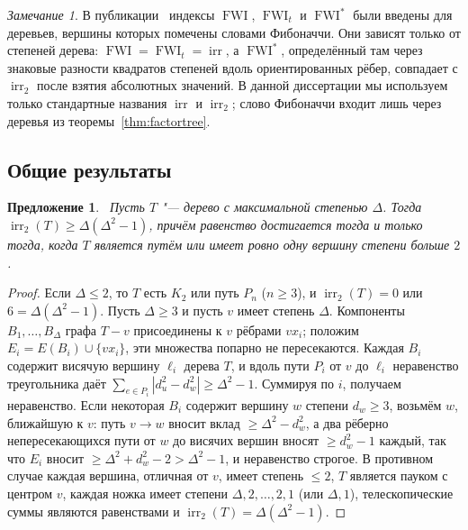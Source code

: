\documentclass[a4paper,14pt]{extreport}
\theoremstyle{plain}
\newtheorem{proposition}[theorem]{Предложение}
\theoremstyle{definition}
\theoremstyle{remark}
\newtheorem{remark}{Замечание}
\begin{document}
\begin{remark}
	В публикации~\cite{HamoudAbdullahCheb} индексы $\operatorname{FWI}$, $\operatorname{FWI}_t$ и $\operatorname{FWI}^*$ были введены для деревьев, вершины которых помечены словами Фибоначчи.
	Они зависят только от степеней дерева: $\operatorname{FWI}=\operatorname{FWI}_t=\operatorname{irr}$, а $\operatorname{FWI}^*$, определённый там через знаковые разности квадратов степеней вдоль ориентированных рёбер, совпадает с $\operatorname{irr}_2$ после взятия абсолютных значений.
	В данной диссертации мы используем только стандартные названия $\operatorname{irr}$ и $\operatorname{irr}_2$; слово Фибоначчи входит лишь через деревья из теоремы~\ref{thm:factortree}.
\end{remark}
\subsection{Общие результаты}

\begin{proposition}~\label{pron1}
	Пусть $T$ "--- дерево с максимальной степенью $\Delta$. Тогда $\operatorname{irr}_2(T)\ge\Delta(\Delta^2-1)$, причём равенство достигается тогда и только тогда, когда $T$ является путём или имеет ровно одну вершину степени больше $2$.
\end{proposition}

\begin{proof}
	Если $\Delta\le2$, то $T$ есть $K_2$ или путь $P_n$ ($n\ge3$), и $\operatorname{irr}_2(T)=0$ или $6=\Delta(\Delta^2-1)$. Пусть $\Delta\ge3$ и пусть $v$ имеет степень $\Delta$.
	Компоненты $B_1,\dots,B_\Delta$ графа $T-v$ присоединены к $v$ рёбрами $vx_i$; положим $E_i=E(B_i)\cup\{vx_i\}$, эти множества попарно не пересекаются.
	Каждая $B_i$ содержит висячую вершину $\ell_i$ дерева $T$, и вдоль пути $P_i$ от $v$ до $\ell_i$ неравенство треугольника даёт
	$\sum_{e\in P_i}|d_u^2-d_w^2|\ge\Delta^2-1$. Суммируя по $i$, получаем неравенство.
	Если некоторая $B_i$ содержит вершину $w$ степени $d_w\ge3$, возьмём $w$, ближайшую к $v$: путь $v\to w$ вносит вклад $\ge\Delta^2-d_w^2$, а два рёберно непересекающихся пути от $w$ до висячих вершин вносят $\ge d_w^2-1$ каждый,
	так что $E_i$ вносит $\ge\Delta^2+d_w^2-2>\Delta^2-1$, и неравенство строгое. В противном случае каждая вершина, отличная от $v$, имеет степень $\le2$, $T$ является пауком с центром $v$,
	каждая ножка имеет степени $\Delta,2,\dots,2,1$ (или $\Delta,1$), телескопические суммы являются равенствами и $\operatorname{irr}_2(T)=\Delta(\Delta^2-1)$.
\end{proof}
\end{document}
